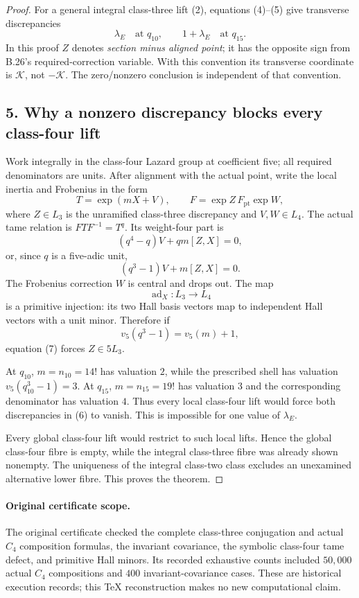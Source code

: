 \documentclass[11pt]{article}
\begin{document}
\begin{proof}
For a general integral class-three lift (2), equations (4)--(5) give transverse discrepancies
\[
 \lambda_E\quad\text{at }q_{10},\qquad
 1+\lambda_E\quad\text{at }q_{15}.
 \tag{6}
\]
In this proof $Z$ denotes \emph{section minus aligned point}; it has the opposite sign from B.26's required-correction variable. With this convention its transverse coordinate is $\mathcal K$, not $-\mathcal K$. The zero/nonzero conclusion is independent of that convention.

\subsection*{5. Why a nonzero discrepancy blocks every class-four lift}
Work integrally in the class-four Lazard group at coefficient five; all required denominators are units. After alignment with the actual point, write the local inertia and Frobenius in the form
\[
 T=\exp(mX+V),\qquad
 F=\exp Z\,F_{\mathrm{pt}}\exp W,
\]
where $Z\in L_3$ is the unramified class-three discrepancy and $V,W\in L_4$. The actual tame relation is $FTF^{-1}=T^q$. Its weight-four part is
\[
 (q^4-q)V+qm[Z,X]=0,
\]
or, since $q$ is a five-adic unit,
\[
 (q^3-1)V+m[Z,X]=0.
 \tag{7}
\]
The Frobenius correction $W$ is central and drops out. The map
\[
 \operatorname{ad}_X:L_3\longrightarrow L_4
\]
is a primitive injection: its two Hall basis vectors map to independent Hall vectors with a unit minor. Therefore if
\[
 v_5(q^3-1)=v_5(m)+1,
\]
equation (7) forces $Z\in5L_3$.

At $q_{10}$, $m=n_{10}=14!$ has valuation $2$, while the prescribed shell has valuation $v_5(q_{10}^3-1)=3$. At $q_{15}$, $m=n_{15}=19!$ has valuation $3$ and the corresponding denominator has valuation $4$. Thus every local class-four lift would force both discrepancies in (6) to vanish. This is impossible for one value of $\lambda_E$.

Every global class-four lift would restrict to such local lifts. Hence the global class-four fibre is empty, while the integral class-three fibre was already shown nonempty. The uniqueness of the integral class-two class excludes an unexamined alternative lower fibre. This proves the theorem.
\end{proof}

\paragraph{Original certificate scope.}
The original certificate checked the complete class-three conjugation and actual $C_4$ composition formulas, the invariant covariance, the symbolic class-four tame defect, and primitive Hall minors. Its recorded exhaustive counts included $50{,}000$ actual $C_4$ compositions and $400$ invariant-covariance cases. These are historical execution records; this TeX reconstruction makes no new computational claim.
\end{document}
